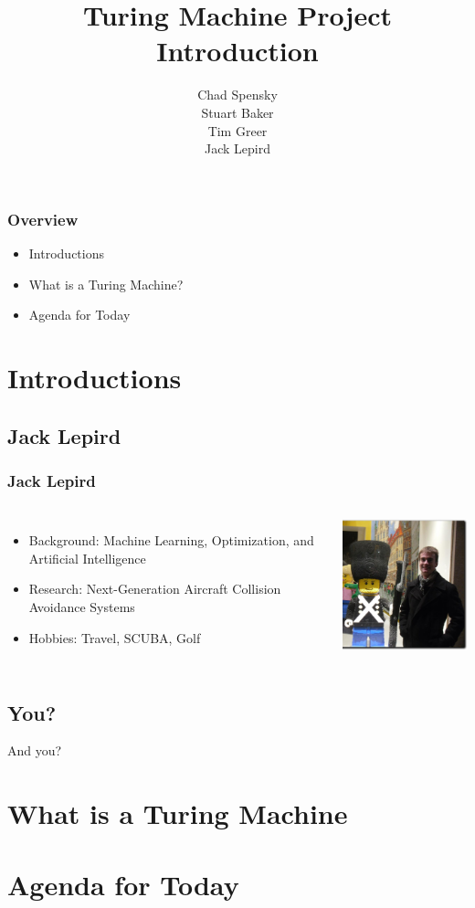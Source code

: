 \documentclass{beamer}
\title{Turing Machine Project Introduction}
\author{Chad Spensky \\
        Stuart Baker \\
        Tim Greer\\
        Jack Lepird}
\begin{document}
\maketitle

\begin{frame}
\frametitle{Overview}
\begin{itemize}
\item Introductions
\item What is a Turing Machine?
\item Agenda for Today
\end{itemize}

\end{frame}

\section{Introductions}


\subsection{Jack Lepird}
\begin{frame}
\frametitle{Jack Lepird}
\begin{columns}
\begin{itemize}
\item Background: Machine Learning, Optimization, and Artificial Intelligence
\item Research: Next-Generation Aircraft Collision Avoidance Systems
\item Hobbies: Travel, SCUBA, Golf
\end{itemize}

\includegraphics[width=5cm]{jack.png}
\end{columns}
\end{frame}

\subsection{You?}
\begin{frame}
And you?
\end{frame}

\section{What is a Turing Machine}

\section{Agenda for Today}
\end{document}
